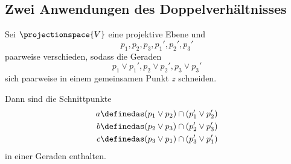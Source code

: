 \subsection*{Zwei Anwendungen des Doppelverhältnisses}
\begin{satz}[Desargues]
  Sei \( \projectionspace{V} \) eine projektive Ebene und
  \begin{equation*}
    p_1,p_2,p_3,p_1',p_2',p_3' 
  \end{equation*}
  paarweise verschieden, sodass die Geraden
  \begin{equation*}
    p_1\vee p_1',p_2\vee p_2',p_3\vee p_3'
  \end{equation*}
  sich paarweise in einem gemeinsamen Punkt \( z \) schneiden.

  Dann sind die Schnittpunkte
  \begin{align*}
    a&\definedas (p_1\vee p_2)\cap (p_1'\vee p_2')\\
    b&\definedas (p_2\vee p_3)\cap (p_2'\vee p_3')\\
    c&\definedas (p_3\vee p_1)\cap (p_3'\vee p_1')
  \end{align*}
  in einer Geraden enthalten.
\end{satz}
